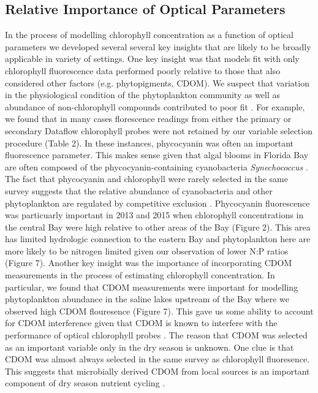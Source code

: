 \subsection{Relative Importance of Optical Parameters}
\label{optical}

In the process of modelling chlorophyll concentration as a function of optical parameters we developed several several key insights that are likely to be broadly applicable in variety of settings. One key insight was that models fit with only chlorophyll fluorescence data performed poorly relative to those that also considered other factors (e.g. phytopigments, CDOM). We suspect that variation in the physiological condition of the phytoplankton community as well as abundance of non-chlorophyll compounds contributed to poor fit \citep{proctor2010new}. For example, we found that in many cases florescence readings from either the primary or secondary Dataflow chlorophyll probes were not retained by our variable selection procedure (Table 2). In these instances, phycocyanin was often an important fluorescence parameter. This makes sense given that algal blooms in Florida Bay are often composed of the phycocyanin-containing cyanobacteria \emph{Synechococcus} \citep{phlips_blooms_1999}. The fact that phycocyanin and chlorophyll were rarely selected in the same survey suggests that the relative abundance of cyanobacteria and other phytoplankton are regulated by competitive exclusion \citep{passarge2006competition}. Phycocyanin fluorescence was particuarly important in 2013 and 2015 when chlorophyll concentrations in the central Bay were high relative to other areas of the Bay (Figure 2). This area has limited hydrologic connection \citep{lee2016circulation} to the eastern Bay and phytoplankton here are more likely to be nitrogen limited given our observation of lower N:P ratios (Figure 7). Another key insight was the importance of incorporating CDOM measurements in the process of estimating chlorophyll concentration. In particular, we found that CDOM measurements were important for modelling phytoplankton abundance in the saline lakes upstream of the Bay where we observed high CDOM flouresence (Figure 7). This gave us some ability to account for CDOM interference given that CDOM is known to interfere with the performance of optical chlorophyll probes \citep{proctor2010new}. The reason that CDOM was selected as an important variable only in the dry season is unknown. One clue is that CDOM was almost always selected in the same survey as chlorophyll fluoresence. This suggests that microbially derived CDOM from local sources is an important component of dry season nutrient cycling \citep{maie2012application}.

